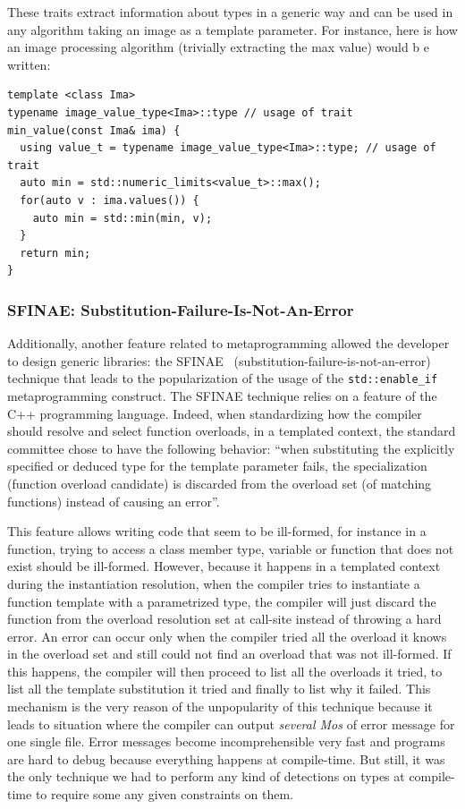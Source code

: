 These traits extract information about types in a generic way and can be used in any algorithm taking an image as a
template parameter. For instance, here is how an image processing algorithm (trivially extracting the max value) would b
e written:

\begin{verbatim}
template <class Ima>
typename image_value_type<Ima>::type // usage of trait
min_value(const Ima& ima) {
  using value_t = typename image_value_type<Ima>::type; // usage of trait
  auto min = std::numeric_limits<value_t>::max();
  for(auto v : ima.values()) {
    auto min = std::min(min, v);
  }
  return min;
}
\end{verbatim}

\subsubsection{SFINAE: Substitution-Failure-Is-Not-An-Error}
\label{subsec:sfinae}

Additionally, another feature related to metaprogramming  allowed the developer to design generic libraries: the
SFINAE~\parencite{vandevoorde.2002.c++} (substitution-failure-is-not-an-error) technique that leads to the
popularization of the usage of the \texttt{std::enable\_if} metaprogramming construct. The SFINAE technique relies on a
feature of the C++ programming language. Indeed, when standardizing how the compiler should resolve and select function
overloads, in a templated context, the standard committee chose to have the following behavior: ``when substituting the
explicitly specified or deduced type for the template parameter fails, the specialization (function overload candidate)
is discarded from the overload set (of matching functions) instead of causing an error''.

This feature allows writing code that seem to be ill-formed, for instance in a function, trying to access a class member
type, variable or function that does not exist should be ill-formed. However, because it happens in a templated context
during the instantiation resolution, when the compiler tries to instantiate a function template with a parametrized
type, the compiler will just discard the function from the overload resolution set at call-site instead of throwing a
hard error. An error can occur only when the compiler tried all the overload it knows in the overload set and still
could not find an overload that was not ill-formed. If this happens, the compiler will then proceed to list all the
overloads it tried, to list all the template substitution it tried and finally to list why it failed. This mechanism is
the very reason of the unpopularity of this technique because it leads to situation where the compiler can output
\emph{several Mos} of error message for one single file. Error messages become incomprehensible very fast and programs
are hard to debug because everything happens at compile-time. But still, it was the only technique we had to perform any
kind of detections on types at compile-time to require some any given constraints on them.


